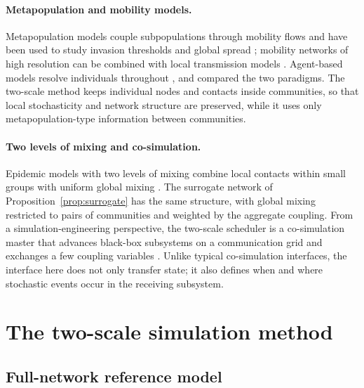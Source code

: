 \documentclass[a4paper,fleqn]{cas-sc}
\begin{document}
\paragraph{Metapopulation and mobility models.}
Metapopulation models couple subpopulations through mobility flows and have been used to study invasion thresholds and global spread \citep{colizza2007reaction,colizza2008,balcan2009,balcan2010modeling}; mobility networks of high resolution can be combined with local transmission models \citep{chang2021}. Agent-based models resolve individuals throughout \citep{eubank2004,kerr2021}, and \citet{ajelli2010} compared the two paradigms. The two-scale method keeps individual nodes and contacts inside communities, so that local stochasticity and network structure are preserved, while it uses only metapopulation-type information between communities.

\paragraph{Two levels of mixing and co-simulation.}
Epidemic models with two levels of mixing combine local contacts within small groups with uniform global mixing \citep{ball1997}. The surrogate network of Proposition~\ref{prop:surrogate} has the same structure, with global mixing restricted to pairs of communities and weighted by the aggregate coupling. From a simulation-engineering perspective, the two-scale scheduler is a co-simulation master that advances black-box subsystems on a communication grid and exchanges a few coupling variables \citep{gomes2018cosim}. Unlike typical co-simulation interfaces, the interface here does not only transfer state; it also defines when and where stochastic events occur in the receiving subsystem.

\section{The two-scale simulation method}
\label{sec:method}

\subsection{Full-network reference model}
\label{sec:reference}
\end{document}
